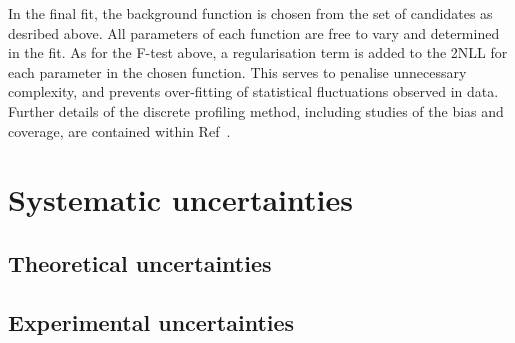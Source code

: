 In the final fit, the background function is chosen from the set of candidates as desribed above.
All parameters of each function are free to vary and determined in the fit.
As for the F-test above, 
a regularisation term is added to the 2NLL for each parameter in the chosen function.
This serves to penalise unnecessary complexity, 
and prevents over-fitting of statistical fluctuations observed in data.
Further details of the discrete profiling method, 
including studies of the bias and coverage,
are contained within Ref~\cite{Envelope}.

\section{Systematic uncertainties}

\subsection{Theoretical uncertainties}

\subsection{Experimental uncertainties}
